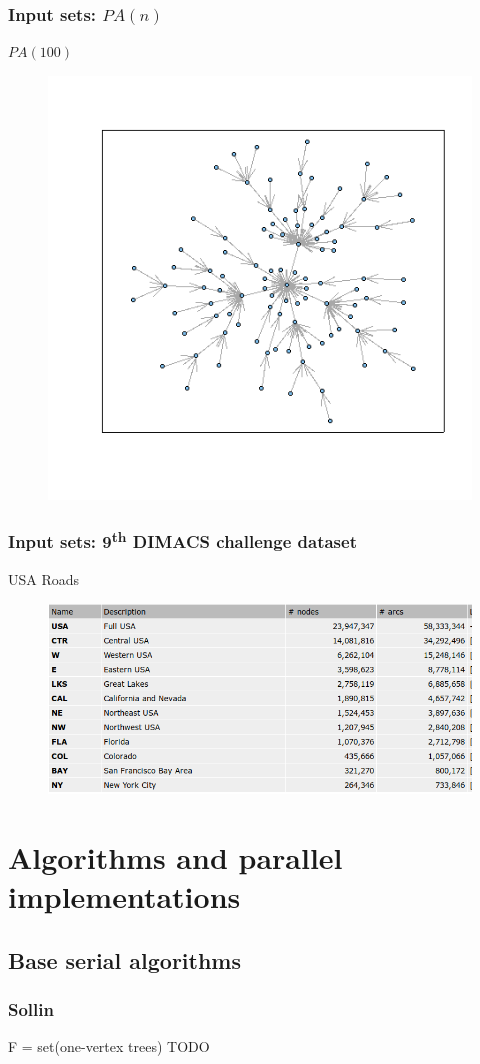 \documentclass{beamer}
\begin{document}
\begin{frame}
\frametitle{Input sets: $PA(n)$}
\centering
$PA(100)$
\begin{figure}
 \includegraphics[width=.7\textwidth]{graphPA.png}
\end{figure}
\end{frame}

\begin{frame}
\frametitle{Input sets: 9\textsuperscript{th} DIMACS challenge dataset}
\centering
USA Roads
\begin{figure}
 \includegraphics[width=.7\textwidth]{graphUSA.png}
\end{figure}
\end{frame}


\section{Algorithms and parallel implementations}

\subsection{Base serial algorithms}

\begin{frame}[fragile]
\frametitle{Sollin}
\small
\begin{algorithm}[H]
\begin{algorithmic}[1]

\STATE F = set(one-vertex trees)
\STATE TODO
\ENDWHILE

\end{algorithmic}
\end{algorithm}
\end{frame}
\end{document}

